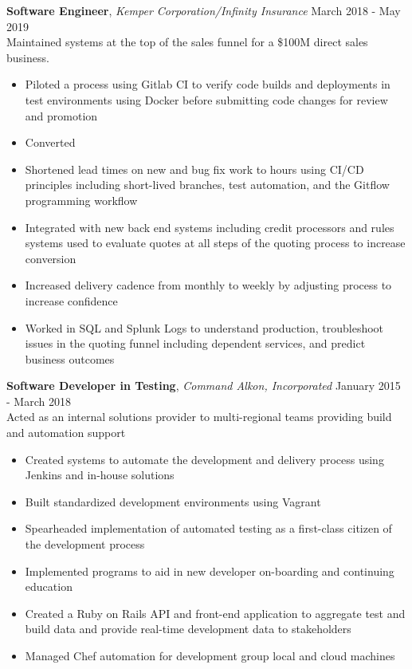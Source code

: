 \documentclass[9pt]{article}
\newenvironment{changemargin}[2]{%
  \begin{list}{}{%
      \setlength{\topsep}{0pt}%
      \setlength{\leftmargin}{#1}%
      \setlength{\rightmargin}{#2}%
      \setlength{\listparindent}{\parindent}%
      \setlength{\itemindent}{\parindent}%
      \setlength{\parsep}{\parskip}%
    }%
  \item[]}{\end{list}
}
\newenvironment{body} {
  \vspace*{-16pt}
  \begin{changemargin}{-0.25in}{-0.5in}
  }	
  {\end{changemargin}
}
\begin{document}
\begin{body}
  \textbf{Software Engineer}, \emph{Kemper Corporation/Infinity Insurance} \hfill March 2018 - May 2019 \\
  \vspace*{3pt}
  Maintained systems at the top of the sales funnel for a \$100M direct sales business.
  \begin{itemize} \itemsep -0pt
  \item Piloted a process using Gitlab CI to verify code builds and deployments in test environments using Docker before submitting code changes for review and promotion
  \item Converted 
  \item Shortened lead times on new and bug fix work to hours using CI/CD principles including short-lived branches, test automation, and the Gitflow programming workflow
  \item Integrated with new back end systems including credit processors and rules systems used to evaluate quotes at all steps of the quoting process to increase conversion
  \item Increased delivery cadence from monthly to weekly by adjusting process to increase confidence
  \item Worked in SQL and Splunk Logs to understand production, troubleshoot issues in the quoting funnel including dependent services, and predict business outcomes
  \end{itemize}
  \vspace{17pt}
  

  \textbf{Software Developer in Testing}, \emph{Command Alkon, Incorporated} \hfill January 2015 - March 2018 \\
  \vspace*{3pt}
  Acted as an internal solutions provider to multi-regional teams providing build and automation support
  \begin{itemize} \itemsep -0pt  %
  \item Created systems to automate the development and delivery process using Jenkins and in-house solutions
  \item Built standardized development environments using Vagrant
  \item Spearheaded implementation of automated testing as a first-class citizen of the development process
  \item Implemented programs to aid in new developer on-boarding and continuing education
  \item Created a Ruby on Rails API and front-end application to aggregate test and build data and provide real-time development data to stakeholders
  \item Managed Chef automation for development group local and cloud machines
  \end{itemize}
  \vspace{17pt}

\end{body}
\end{document}
